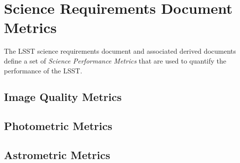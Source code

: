 \section{Science Requirements Document Metrics}

The LSST science requirements document and associated derived documents define a set of \textit{Science Performance Metrics} that are used to quantify the performance of the LSST. 

\subsection{Image Quality Metrics}

 \subsection{Photometric Metrics}
 
 \subsection{Astrometric Metrics} 